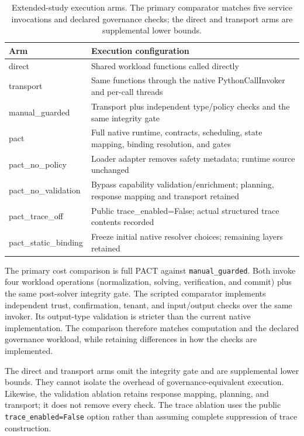 \documentclass[10pt,twocolumn,a4paper]{article}
\begin{document}
\begin{table}[t]
\centering
\caption{Extended-study execution arms. The primary comparator matches five service invocations and declared governance checks; the direct and transport arms are supplemental lower bounds.}
\label{tab:arms}
\small
\setlength{\tabcolsep}{4pt}
\renewcommand{\arraystretch}{1.12}
\begin{tabularx}{\textwidth}{@{}p{3.3cm}X@{}}
\toprule
Arm & Execution configuration\\
\midrule
direct & Shared workload functions called directly\\
transport & Same functions through the native PythonCallInvoker and per-call threads\\
manual\_guarded & Transport plus independent type/policy checks and the same integrity gate\\
pact & Full native runtime, contracts, scheduling, state mapping, binding resolution, and gates\\
pact\_no\_policy & Loader adapter removes safety metadata; runtime source unchanged\\
pact\_no\_validation & Bypass capability validation/enrichment; planning, response mapping and transport retained\\
pact\_trace\_off & Public trace\_enabled=False; actual structured trace contents recorded\\
pact\_static\_binding & Freeze initial native resolver choices; remaining layers retained\\
\bottomrule
\end{tabularx}
\end{table}
The primary cost comparison is full PACT against {\small{}\nolinkurl{manual_guarded}}. Both invoke four workload operations (normalization, solving, verification, and commit) plus the same post-solver integrity gate. The scripted comparator implements independent trust, confirmation, tenant, and input/output checks over the same invoker. Its output-type validation is stricter than the current native implementation. The comparison therefore matches computation and the declared governance workload, while retaining differences in how the checks are implemented.


The direct and transport arms omit the integrity gate and are supplemental lower bounds. They cannot isolate the overhead of governance-equivalent execution. Likewise, the validation ablation retains response mapping, planning, and transport; it does not remove every check. The trace ablation uses the public {\small{}\nolinkurl{trace_enabled=False}} option rather than assuming complete suppression of trace construction.
\end{document}
